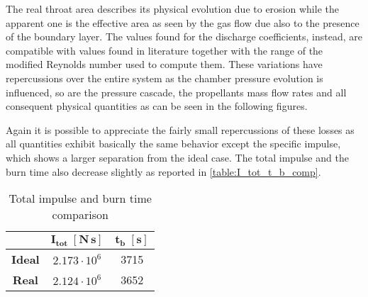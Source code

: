 
The real throat area describes its physical evolution due to erosion while the apparent one is the effective area as seen by the gas flow due also to the presence of the boundary layer. The values found for the discharge coefficients, instead, are compatible with values found in literature together with the range of the modified Reynolds number used to compute them. \cite{slides_maggi} These variations have repercussions over the entire system as the chamber pressure evolution is influenced, so are the pressure cascade, the propellants mass flow rates and all consequent physical quantities as can be seen in the following figures.  


Again it is possible to appreciate the fairly small repercussions of these losses as all quantities exhibit basically the same behavior except the specific impulse, which shows a larger separation from the ideal case. The total impulse and the burn time also decrease slightly as reported in \autoref{table:I_tot_t_b_comp}.

\begin{table}[H]
    \renewcommand{\arraystretch}{1.25}
    \centering
    \begin{tabular}{|c|c|c|}
        \hline
        & $\boldsymbol{I_{tot} \; [\textbf{N} \, \textbf{s}]}$ & $\boldsymbol{t_b \; [\textbf{s}]}$ \\
        \hline
        \hline
        \textbf{Ideal} & $2.173 \cdot 10^6$ & 3715 \\
        \hline
        \textbf{Real} & $2.124 \cdot 10^6$ & 3652 \\
        \hline
    \end{tabular}
    \caption{Total impulse and burn time comparison}
    \label{table:I_tot_t_b_comp}
\end{table}